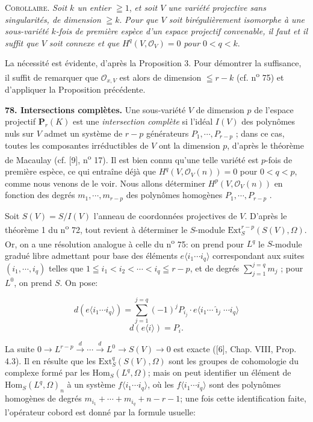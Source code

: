 \textsc{Corollaire}. \textit{Soit $k$ un entier} $\geqq 1$, \textit{et soit $V$ une variété projective sans singularités, de dimension} $\geqq k$. \textit{Pour que $V$ soit birégulièrement isomorphe à une sous-variété $k$-fois de première espèce d'un espace projectif convenable, il faut et il suffit que $V$ soit connexe et que} $H^q(V, \mathcal{O}_V) = 0$ \textit{pour} $0 < q < k$.

La nécessité est évidente, d'après la Proposition 3. Pour démontrer la suffisance, il suffit de remarquer que $\mathcal{O}_{x,V}$ est alors de dimension $\leqq r - k$ (cf. n\textsuperscript{o} 75) et d'appliquer la Proposition précédente.

\textbf{78. Intersections complètes.} Une sous-variété $V$ de dimension $p$ de l'espace projectif $\mathbf{P}_r(K)$ est une \textit{intersection complète} si l'idéal $I(V)$ des polynômes nuls sur $V$ admet un système de $r - p$ générateurs $P_1 , \cdots , P_{r-p}$ ; dans ce cas, toutes les composantes irréductibles de $V$ ont la dimension $p$, d'après le théorème de Macaulay (cf. [9], n\textsuperscript{o} 17). Il est bien connu qu'une telle variété est $p$-fois de première espèce, ce qui entraîne déjà que $H^q(V, \mathcal{O}_V(n)) = 0$ pour $0 < q < p$, comme nous venons de le voir. Nous allons déterminer $H^p(V, \mathcal{O}_V(n))$ en fonction des degrés $m_1 , \cdots , m_{r-p}$ des polynômes homogènes $P_1 , \cdots , P_{r-p}$ .

Soit $S(V) = S/I(V)$ l'anneau de coordonnées projectives de $V$. D'après le théorème 1 du n\textsuperscript{o} 72, tout revient à déterminer le $S$-module $\mathrm{Ext}_S^{r-p}(S(V), \Omega)$. Or, on a une résolution analogue à celle du n\textsuperscript{o} 75: on prend pour $L^q$ le $S$-module gradué libre admettant pour base des éléments $e\langle i_1 \cdots i_q \rangle$ correspondant aux suites $(i_1 , \cdots , i_q)$ telles que $1 \leqq i_1 < i_2 < \cdots < i_q \leqq r - p$, et de degrés $\sum_{j=1}^{j=q} m_j$ ; pour $L^0$, on prend $S$. On pose:

\begin{equation*}
d(e\langle i_1 \cdots i_q \rangle) = \sum_{j=1}^{j=q} (-1)^j P_{i_j} \cdot e\langle i_1 \cdots \hat{\imath}_j \cdots i_q \rangle
\end{equation*}
\begin{equation*}
d(e\langle i \rangle) = P_i .
\end{equation*}

La suite $0 \rightarrow L^{r-p} \overset{d}{\rightarrow} \cdots \overset{d}{\rightarrow} L^0 \rightarrow S(V) \rightarrow 0$ est exacte ([6], Chap. VIII, Prop. 4.3). Il en résulte que les $\mathrm{Ext}_S^q(S(V), \Omega)$ sont les groupes de cohomologie du complexe formé par les $\mathrm{Hom}_S(L^q, \Omega)$; mais on peut identifier un élément de $\mathrm{Hom}_S(L^q, \Omega)_n$ à un système $f\langle i_1 \cdots i_q \rangle$, où les $f\langle i_1 \cdots i_q \rangle$ sont des polynômes homogènes de degrés $m_{i_1} + \cdots + m_{i_q} + n - r - 1$; une fois cette identification faite, l'opérateur cobord est donné par la formule usuelle:

